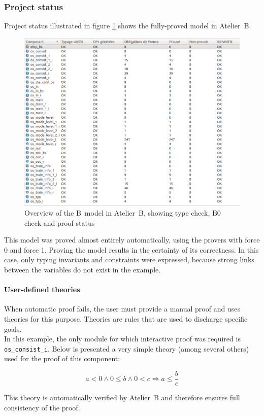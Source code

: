\subsubsection{Project status}
Project status illustrated in figure \ref{fig:atelierb} shows the fully-proved model in Atelier~B.

\begin{figure}[h!]
\centering
\includegraphics[width=1\textwidth]{figures/atelierb}
\caption{Overview of the B~model in Atelier~B, showing type check, B0 check and proof status}
\label{fig:atelierb}
\end{figure}

This model was proved almost entirely automatically, using the provers with force 0 and force 1. Proving the model results in the certainty of its correctness. In this case, only typing invariants and constraints were expressed, because strong links between the variables do not exist in the example.

\paragraph{User-defined theories}
When automatic proof fails, the user must provide a manual proof and uses theories for this purpose. Theories are rules that are used to discharge specific goals.\\
In this example, the only module for which interactive proof was required is \verb+os_consist_i+. Below is presented a very simple theory (among several others) used for the proof of this component:

\begin{equation}
\tag{User theory 1}
a < 0 \land 0 \leq b \land 0 < c \Rightarrow a \leq \frac{b}{c}
\end{equation}

This theory is automatically verified by Atelier~B and therefore ensures full consistency of the proof.

